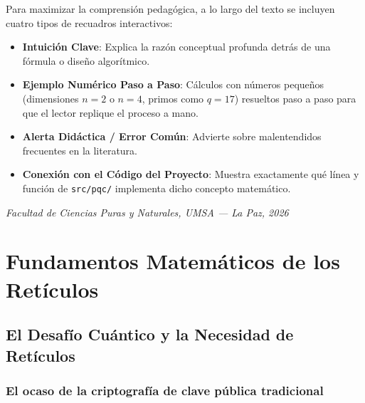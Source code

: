 \documentclass[11pt,a4paper,twoside,openright]{book}
\theoremstyle{plain}
\theoremstyle{definition}
\theoremstyle{remark}
\begin{document}
Para maximizar la comprensi\'on pedag\'ogica, a lo largo del texto se incluyen cuatro tipos de recuadros interactivos:
\begin{itemize}
  \item \textbf{Intuici\'on Clave}: Explica la raz\'on conceptual profunda detr\'as de una f\'ormula o dise\~no algor\'itmico.
  \item \textbf{Ejemplo Num\'erico Paso a Paso}: C\'alculos con n\'umeros peque\~nos (dimensiones $n=2$ o $n=4$, primos como $q=17$) resueltos paso a paso para que el lector replique el proceso a mano.
  \item \textbf{Alerta Did\'actica / Error Com\'un}: Advierte sobre malentendidos frecuentes en la literatura.
  \item \textbf{Conexi\'on con el C\'odigo del Proyecto}: Muestra exactamente qu\'e l\'inea y funci\'on de \texttt{src/pqc/} implementa dicho concepto matem\'atico.
\end{itemize}

\vspace{0.8cm}
\noindent\textit{Facultad de Ciencias Puras y Naturales, UMSA --- La Paz, 2026}

\mainmatter

\part{Fundamentos Matem\'aticos de los Ret\'iculos}

\chapter{El Desaf\'io Cu\'antico y la Necesidad de Ret\'iculos}
\label{chap:desafio_cuantico}

\section{El ocaso de la criptograf\'ia de clave p\'ublica tradicional}
\end{document}
